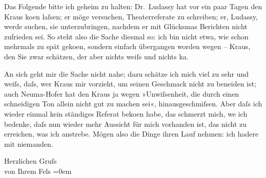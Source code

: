 \pstart
           Das Folgende bitte ich geheim zu halten: Dr. Ludassy hat vor ein paar Tagen den Kraus ko{\geminationm}en laſsen; er möge versuchen,
               Theaterreferate zu schreiben; er, Ludassy,
               werde suchen, sie unterzubringen, nachdem er mit Glücksma{\geminationn}s Berichten nicht zufrieden sei. So steht also die Sache diesmal so: ich bin
               nicht etwa, wie schon mehrmals zu spät geko{\geminationm}en, sondern
               einfach übergangen worden wegen – Kraus, den
               Sie zwar schätzen, der aber nichts weiſs und nichts ka{\geminationn}.\pend
           
\pstart
           {\pb}An sich geht mir die Sache nicht nahe; dazu schätze
               ich mich viel zu sehr und weiſs, daſs, wer Kraus mir vorzieht, um seinen Geschmack nicht zu beneiden ist; auch Neuma{\geminationn}-Hofer hat
               den \introOben{}Kraus\introOben{} ja wegen »Unwiſsenheit, die durch einen schneidigen Ton allein nicht gut zu
               machen sei«, hinausgeschmiſsen. Aber daſs ich wieder einmal kein ständiges Referat
                  beko{\geminationm}en habe, das schmerzt mich, we{\geminationn} ich bedenke, daſs nun wieder mehr Aussicht für mich
               vorhanden ist, das nicht zu erreichen, was ich anstrebe. Mögen also die Dinge ihren
               Lauf nehmen: ich hadere mit niemanden.\pend
           
\pstart
           Herzlichen Gruſs{\\[\baselineskip]}von Ihrem \spacefill\mbox{Fels}\pend
           \leftskip=0em{}\endnumbering{}  \newcommand{\dateiname}{L00393}\newcommand{\titel}{Friedrich M. Fels an Arthur Schnitzler, 26. 10. 1894}\newcommand{\editorInnen}{Martin Anton Müller und Gerd-Hermann Susen}

